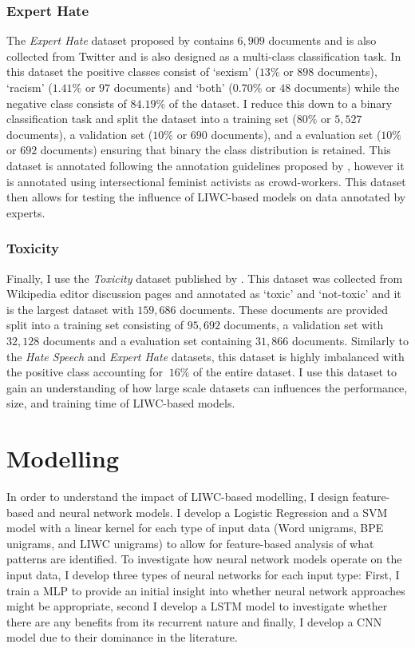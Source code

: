 \subsubsection{Expert Hate}
The \textit{Expert Hate} dataset proposed by \citet{Waseem:2016} contains $6,909$ documents and is also collected from Twitter and is also designed as a multi-class classification task. In this dataset the positive classes consist of `sexism' ($13\%$ or $898$ documents), `racism' ($1.41\%$ or $97$ documents) and `both' ($0.70\%$ or $48$ documents) while the negative class consists of $84.19\%$ of the dataset. I reduce this down to a binary classification task and split the dataset into a training set ($80\%$ or $5,527$ documents), a validation set ($10\%$ or $690$ documents), and a evaluation set ($10\%$ or $692$ documents) ensuring that binary the class distribution is retained. This dataset is annotated following the annotation guidelines proposed by \citet{Waseem-Hovy:2016}, however it is annotated using intersectional feminist activists as crowd-workers. This dataset then allows for testing the influence of LIWC-based models on data annotated by experts.

\subsubsection{Toxicity}
Finally, I use the \textit{Toxicity} dataset published by \citet{Wulczyn:2017}. This dataset was collected from Wikipedia editor discussion pages and annotated as `toxic' and `not-toxic' and it is the largest dataset with $159,686$ documents. These documents are provided split into a training set consisting of $95,692$ documents, a validation set with $32,128$ documents and a evaluation set containing $31,866$ documents. Similarly to the \textit{Hate Speech} and \textit{Expert Hate} datasets, this dataset is highly imbalanced with the positive class accounting for $~16\%$ of the entire dataset. I use this dataset to gain an understanding of how large scale datasets can influences the performance, size, and training time of LIWC-based models.

\section{Modelling}\label{sec:liwc_modelling}

In order to understand the impact of LIWC-based modelling, I design feature-based and neural network models. I develop a Logistic Regression and a SVM model with a linear kernel for each type of input data (Word unigrams, BPE unigrams, and LIWC unigrams) to allow for feature-based analysis of what patterns are identified. To investigate how neural network models operate on the input data, I develop three types of neural networks for each input type: First, I train a MLP to provide an initial insight into whether neural network approaches might be appropriate, second I develop a LSTM model to investigate whether there are any benefits from its recurrent nature and finally, I develop a CNN model due to their dominance in the literature.\vspace{5mm}

